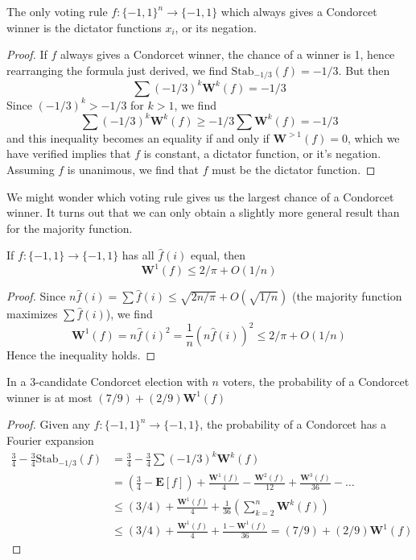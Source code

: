 \begin{theorem}[Kalai]
    The only voting rule $f: \{ -1, 1 \}^n \to \{ -1, 1 \}$ which always gives a Condorcet winner is the dictator functions $x_i$, or its negation.
\end{theorem}
\begin{proof}
    If $f$ always gives a Condorcet winner, the chance of a winner is 1, hence rearranging the formula just derived, we find $\text{Stab}_{-1/3}(f) = -1/3$. But then
    \[ \sum (-1/3)^k \mathbf{W}^k(f) = -1/3 \]
    Since $(-1/3)^k > -1/3$ for $k > 1$, we find
    \[ \sum (-1/3)^k \mathbf{W}^k(f) \geq -1/3 \sum \mathbf{W}^k(f) = -1/3 \]
    and this inequality becomes an equality if and only if $\mathbf{W}^{> 1}(f) = 0$, which we have verified implies that $f$ is constant, a dictator function, or it's negation. Assuming $f$ is unanimous, we find that $f$ must be the dictator function.
\end{proof}

We might wonder which voting rule gives us the largest chance of a Condorcet winner. It turns out that we can only obtain a slightly more general result than for the majority function.

\begin{lemma}
    If $f: \{ -1, 1 \} \to \{ -1, 1 \}$ has all $\widehat{f}(i)$ equal, then
    \[ \mathbf{W}^1(f) \leq 2/\pi + O(1/n) \]
\end{lemma}
\begin{proof}
    Since $n \widehat{f}(i) = \sum \widehat{f}(i) \leq \sqrt{2n/\pi} + O(\sqrt{1/n})$ (the majority function maximizes $\sum \widehat{f}(i)$), we find
    \[ \mathbf{W}^1(f) = n \widehat{f}(i)^2 = \frac{1}{n} (n \widehat{f}(i))^2 \leq 2/\pi + O(1/n) \]
    Hence the inequality holds.
\end{proof}

\begin{theorem}
    In a 3-candidate Condorcet election with $n$ voters, the probability of a Condorcet winner is at most $(7/9) + (2/9) \mathbf{W}^1(f)$
\end{theorem}
\begin{proof}
    Given any $f: \{ -1, 1 \}^n \to \{ -1, 1 \}$, the probability of a Condorcet has a Fourier expansion
    \begin{align*}
        \frac{3}{4} - \frac{3}{4} \text{Stab}_{-1/3}(f) &= \frac{3}{4} - \frac{3}{4} \sum (-1/3)^k \mathbf{W}^k(f)\\
        &= \left( \frac{3}{4} - \mathbf{E}[f] \right) + \frac{\mathbf{W}^1(f)}{4} - \frac{\mathbf{W}^2(f)}{12} + \frac{\mathbf{W}^3(f)}{36} - \dots\\
        &\leq (3/4) + \frac{\mathbf{W}^1(f)}{4} + \frac{1}{36} \left( \sum_{k = 2}^n \mathbf{W}^{k}(f) \right)\\
        &\leq (3/4) + \frac{\mathbf{W}^1(f)}{4} + \frac{1 - \mathbf{W}^1(f)}{36} = (7/9) + (2/9) \mathbf{W}^1(f)
    \end{align*}
\end{proof}


